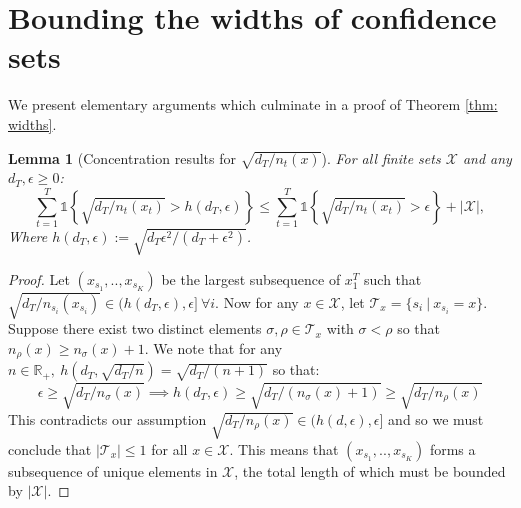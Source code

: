 \documentclass{article}
\newtheorem{lemma}{Lemma}
\newcommand{\Real}{\mathds{R}}
\newcommand{\Ind}{\mathds{1}}
\newcommand{\Xc}{\mathcal{X}}
\begin{document}
\newpage
\small{


}
\newpage




\appendix
\section{Bounding the widths of confidence sets}
\label{sec: widths}
We present elementary arguments which culminate in a proof of Theorem \ref{thm: widths}.

\begin{lemma}[Concentration results for $\sqrt{d_T / n_t(x)}$]
\label{lem: rad} \hspace{0.000000001mm} \newline
For all finite sets $\Xc$ and any $d_T, \epsilon \ge 0$:
$$\sum_{t=1}^T \Ind \left\{ \sqrt{ d_T / n_t(x_t) } > h(d_T,\epsilon) \right\} \le 
	\sum_{t=1}^T \Ind \left\{ \sqrt{ d_T/n_t(x_t) } > \epsilon \right\} + |\Xc|,$$
Where $h(d_T, \epsilon) := \sqrt{d_T \epsilon^2 / (d_T + \epsilon^2)}$.
\end{lemma}
\begin{proof}
Let $(x_{s_1},..,x_{s_K})$ be the largest subsequence of $x^T_1$ such that $\sqrt{d_T / n_{s_i}(x_{s_i})}\in ( h(d_T,\epsilon), \epsilon] \ \forall i$. 
Now for any $x \in \Xc$, let $\mathcal{T}_x = \{ s_i \ | \ x_{s_i} = x \}$.
Suppose there exist two distinct elements $\sigma, \rho \in \mathcal{T}_x$ with $\sigma < \rho$ so that $n_\rho(x) \ge n_\sigma(x) + 1$.
We note that for any $n \in \Real_+, \  h(d_T, \sqrt{d_T / n}) = \sqrt{d_T / (n+1)}$ so that:
$$ \epsilon \ge \sqrt{ d_T / n_\sigma(x) } \implies h(d_T, \epsilon) \ge \sqrt{ d_T / (n_\sigma(x) + 1) } \ge \sqrt{ d_T / n_\rho(x) } $$
This contradicts our assumption $\sqrt{d_T / n_\rho(x)} \in ( h(d,\epsilon), \epsilon]$ and so we must conclude that $| \mathcal{T}_x| \le 1$ for all $ x \in \Xc$.
This means that $(x_{s_1},..,x_{s_K})$ forms a subsequence of unique elements in $\Xc$, the total length of which must be bounded by $| \Xc | $.
\end{proof}
\end{document}
